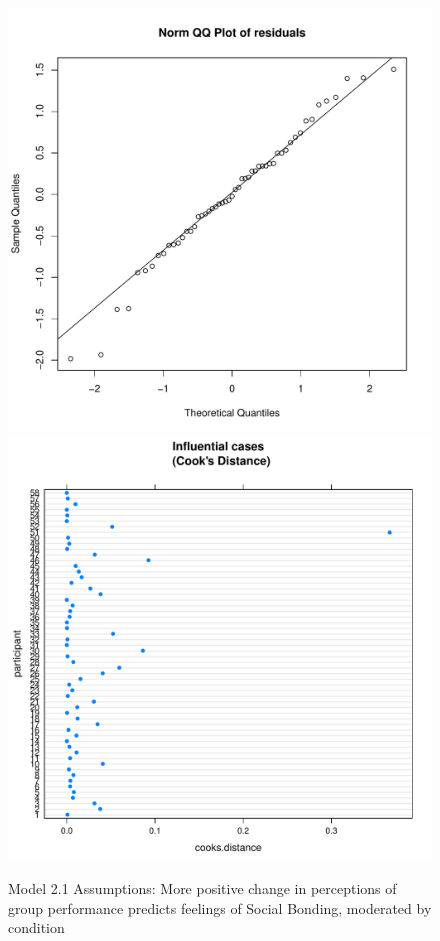 \begin{figure}[htbp]
    \includegraphics[scale =.4]{images/TEM21QQNorm.pdf}
    \includegraphics[scale =.4]{images/TEM21CooksD.pdf}
    \caption{Model 2.1 Assumptions: More positive change in perceptions of group performance predicts feelings of Social Bonding, moderated by condition}
    \label{fig:M21Assumptions}
\end{figure}

